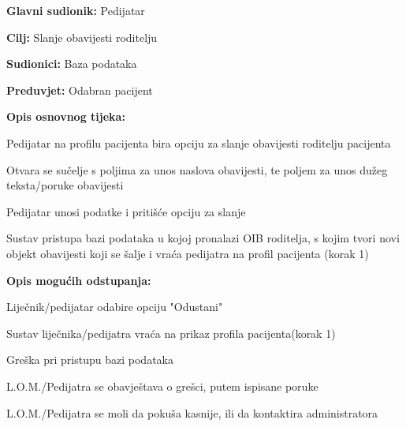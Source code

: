 					\noindent {}
					\begin{packed_item}
						
						\item \textbf{Glavni sudionik: }Pedijatar
						\item  \textbf{Cilj:} Slanje obavijesti roditelju
						\item  \textbf{Sudionici:} Baza podataka
						\item  \textbf{Preduvjet:} Odabran pacijent
						\item  \textbf{Opis osnovnog tijeka:}
						
						\item[] \begin{packed_enum}
							
							\item Pedijatar na profilu pacijenta bira opciju za slanje obavijesti roditelju pacijenta
							\item Otvara se sučelje s poljima za unos naslova obavijesti, te poljem za unos dužeg teksta/poruke obavijesti
							\item Pedijatar unosi podatke i pritišće opciju za slanje
							\item Sustav pristupa bazi podataka u kojoj pronalazi OIB roditelja, s kojim tvori novi objekt obavijesti koji se šalje i vraća pedijatra na profil pacijenta (korak 1)
						\end{packed_enum}
						\item \textbf{Opis mogućih odstupanja:}
						\item[]	\begin{packed_item}
								\item[3.a] Liječnik/pedijatar odabire opciju "Odustani"
								\item[] \begin{packed_enum}
									\item Sustav liječnika/pedijatra vraća na prikaz profila pacijenta(korak 1)
								\end{packed_enum}
							\item[4.a] Greška pri pristupu bazi podataka
							\item[] \begin{packed_enum}
								
								\item L.O.M./Pedijatra se obavještava o grešci, putem ispisane poruke
								\item L.O.M./Pedijatra se moli da pokuša kasnije, ili da kontaktira administratora
								
							\end{packed_enum}
						\end{packed_item}
					\end{packed_item}
					
